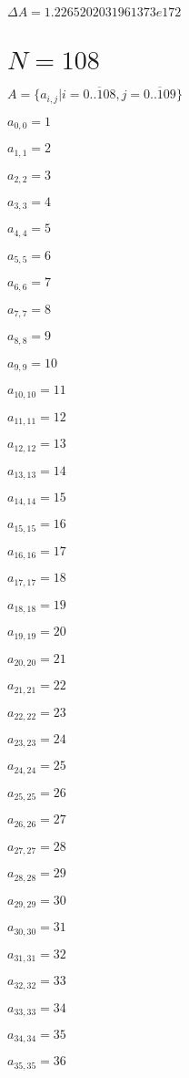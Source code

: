 \documentclass[a4paper,12pt]{article}
\begin{document}
$\Delta A = 1.2265202031961373e172$



\section{ $N = 108$ }
$A = \{ a _{ i, j } | i = \overline { 0..108 }, j = \overline { 0..109 } \}$

$a _{ 0, 0 } = 1$

$a _{ 1, 1 } = 2$

$a _{ 2, 2 } = 3$

$a _{ 3, 3 } = 4$

$a _{ 4, 4 } = 5$

$a _{ 5, 5 } = 6$

$a _{ 6, 6 } = 7$

$a _{ 7, 7 } = 8$

$a _{ 8, 8 } = 9$

$a _{ 9, 9 } = 10$

$a _{ 10, 10 } = 11$

$a _{ 11, 11 } = 12$

$a _{ 12, 12 } = 13$

$a _{ 13, 13 } = 14$

$a _{ 14, 14 } = 15$

$a _{ 15, 15 } = 16$

$a _{ 16, 16 } = 17$

$a _{ 17, 17 } = 18$

$a _{ 18, 18 } = 19$

$a _{ 19, 19 } = 20$

$a _{ 20, 20 } = 21$

$a _{ 21, 21 } = 22$

$a _{ 22, 22 } = 23$

$a _{ 23, 23 } = 24$

$a _{ 24, 24 } = 25$

$a _{ 25, 25 } = 26$

$a _{ 26, 26 } = 27$

$a _{ 27, 27 } = 28$

$a _{ 28, 28 } = 29$

$a _{ 29, 29 } = 30$

$a _{ 30, 30 } = 31$

$a _{ 31, 31 } = 32$

$a _{ 32, 32 } = 33$

$a _{ 33, 33 } = 34$

$a _{ 34, 34 } = 35$

$a _{ 35, 35 } = 36$
\end{document}
